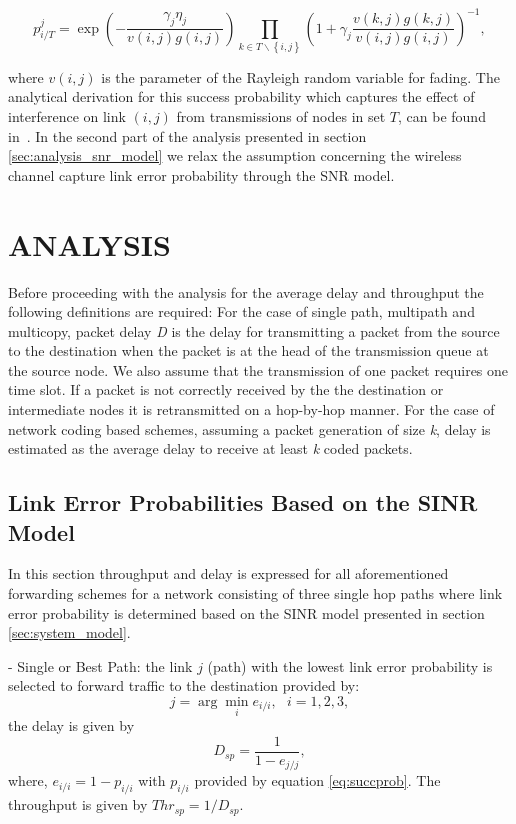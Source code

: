 \documentclass[journal, onecolumn, 12pt]{IEEEtran}
\begin{document}
\begin{equation}
\label{eq:succprob}
p_{i/T}^{j}=\exp\left(-\frac{\gamma_{j}\eta_{j}}{v(i,j)g(i,j)}\right) \prod_{k\in T\backslash \left\{i,j\right\}}{\left(1+\gamma_{j}\frac{v(k,j)g(k,j)}{v(i,j)g(i,j)}\right)}^{-1},
\end{equation}

where $v(i,j)$ is the parameter of the Rayleigh random variable for fading. The analytical derivation for this success probability
which captures the effect of interference on link $(i,j)$ from transmissions of nodes in set $T$, can be found in~\cite{b:Nguyen}.
In the second part of the analysis presented in section \ref{sec:analysis_snr_model} we relax the assumption concerning the wireless channel capture link error probability through the SNR model.

\section{\uppercase{Analysis}}
\label{sec:analysis}

Before proceeding with the analysis for the average delay and throughput the following definitions are required:
For the case of single path, multipath and multicopy, packet delay \textit{D} is the delay for transmitting a packet from the source to the destination when the packet is at the head of the transmission queue at the source node.
We also assume that the transmission of one packet requires one time slot.
If a packet is not correctly received by the the destination or intermediate nodes it is retransmitted on a hop-by-hop manner.
For the case of network coding based schemes, assuming a packet generation of size \textit{k}, delay is estimated as the average delay to receive at least \textit{k} coded packets.

\subsection{Link Error Probabilities Based on the SINR Model}
\label{sec:analysis_sinr_model}

In this section throughput and delay is expressed for all aforementioned forwarding schemes for a network consisting of three single hop paths where link error probability is determined
based on the SINR model presented in section \ref{sec:system_model}.

- Single or Best Path: the link $j$ (path) with the lowest link error probability is selected to forward traffic to the destination provided by:
\begin{equation}
j=\arg\min_{i} e_{i/i},\text{ }i=1,2,3,
\end{equation}
the delay is given by
\begin{equation}
D_{sp}=\frac{1}{1-e_{j/j}},
\end{equation}
where, $e_{i/i} = 1-p_{i/i}$ with $p_{i/i}$ provided by equation \ref{eq:succprob}. The throughput is given by $Thr_{sp}=1/D_{sp}$.
\end{document}
